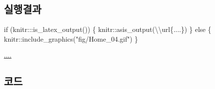 \documentclass[
  b5paperpaper,
  DIV=11,
  numbers=noendperiod]{scrreprt}
\newenvironment{Shaded}{\begin{snugshade}}{\end{snugshade}}
\newcommand{\ControlFlowTok}[1]{\textcolor[rgb]{0.00,0.23,0.31}{#1}}
\newcommand{\FunctionTok}[1]{\textcolor[rgb]{0.28,0.35,0.67}{#1}}
\newcommand{\NormalTok}[1]{\textcolor[rgb]{0.00,0.23,0.31}{#1}}
\newcommand{\SpecialCharTok}[1]{\textcolor[rgb]{0.37,0.37,0.37}{#1}}
\newcommand{\StringTok}[1]{\textcolor[rgb]{0.13,0.47,0.30}{#1}}
\begin{document}
\hypertarget{uxc2e4uxd589uxacb0uxacfc-4}{%
\subsection{실행결과}\label{uxc2e4uxd589uxacb0uxacfc-4}}

\begin{Shaded}
\begin{Highlighting}[]
\ControlFlowTok{if}\NormalTok{ (knitr}\SpecialCharTok{:::}\FunctionTok{is\_latex\_output}\NormalTok{()) \{}
\NormalTok{  knitr}\SpecialCharTok{::}\FunctionTok{asis\_output}\NormalTok{(}\StringTok{\textquotesingle{}}\SpecialCharTok{\textbackslash{}\textbackslash{}}\StringTok{url\{....\}\textquotesingle{}}\NormalTok{)}
\NormalTok{\} }\ControlFlowTok{else}\NormalTok{ \{}
\NormalTok{  knitr}\SpecialCharTok{::}\FunctionTok{include\_graphics}\NormalTok{(}\StringTok{"fig/Home\_04.gif"}\NormalTok{)}
\NormalTok{\}}
\end{Highlighting}
\end{Shaded}

\url{....}

\hypertarget{uxcf54uxb4dc-4}{%
\subsection{코드}\label{uxcf54uxb4dc-4}}
\end{document}
